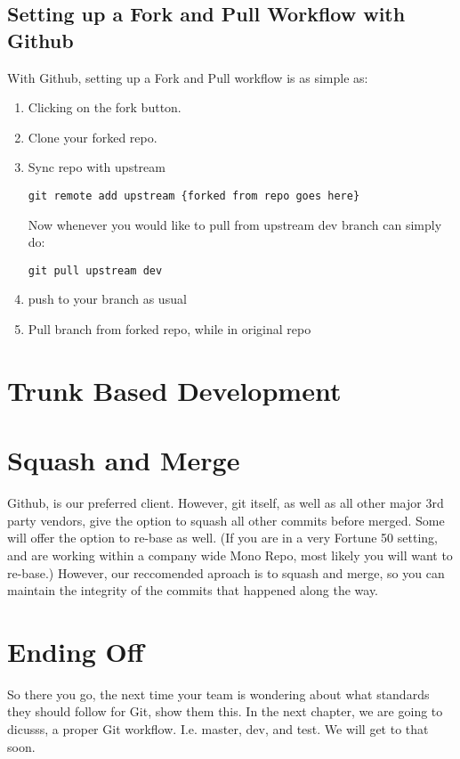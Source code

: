 \subsection { Setting up a Fork and Pull Workflow with Github }
With Github, setting up a Fork and Pull workflow is as simple as: 
\begin{enumerate}
  \item Clicking on the fork button.
  \item Clone your forked repo.
  \item Sync repo with upstream 
\begin{verbatim}
git remote add upstream {forked from repo goes here}
\end{verbatim}
Now whenever you would like to pull from upstream dev branch can simply do: 
\begin{verbatim}
git pull upstream dev   
\end{verbatim}
  \item push to your branch as usual
  \item Pull branch from forked repo, while in original repo 
\end{enumerate}

\section{Trunk Based Development}

\section { Squash and Merge }
Github, is our preferred client. However, git itself, as well as all other major 3rd party vendors, give the option to squash all other commits before merged. Some will offer the option to re-base as well. (If you are in a very Fortune 50 setting, and are working within a company wide Mono Repo, most likely you will want to re-base.) However, our reccomended aproach is to squash and merge, so you can maintain the integrity of the commits that happened along the way. 

\section{Ending Off}
So there you go, the next time your team is wondering about what standards they should follow for Git, show them this. In the next chapter, we are going to dicusss, a proper Git workflow. I.e. master, dev, and test. We will get to that soon. 